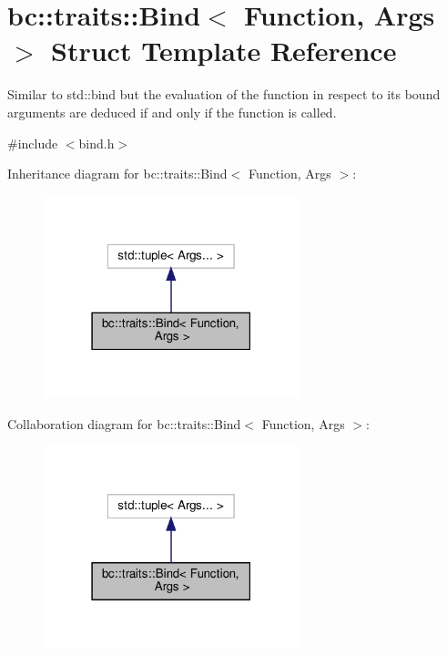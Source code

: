 \hypertarget{structbc_1_1traits_1_1Bind}{}\section{bc\+:\+:traits\+:\+:Bind$<$ Function, Args $>$ Struct Template Reference}
\label{structbc_1_1traits_1_1Bind}


Similar to std\+::bind but the evaluation of the function in respect to its bound arguments are deduced if and only if the function is called.  




{\ttfamily \#include $<$bind.\+h$>$}



Inheritance diagram for bc\+:\+:traits\+:\+:Bind$<$ Function, Args $>$\+:\nopagebreak
\begin{figure}[H]
\begin{center}
\leavevmode
\includegraphics[width=210pt]{structbc_1_1traits_1_1Bind__inherit__graph}
\end{center}
\end{figure}


Collaboration diagram for bc\+:\+:traits\+:\+:Bind$<$ Function, Args $>$\+:\nopagebreak
\begin{figure}[H]
\begin{center}
\leavevmode
\includegraphics[width=210pt]{structbc_1_1traits_1_1Bind__coll__graph}
\end{center}
\end{figure}
